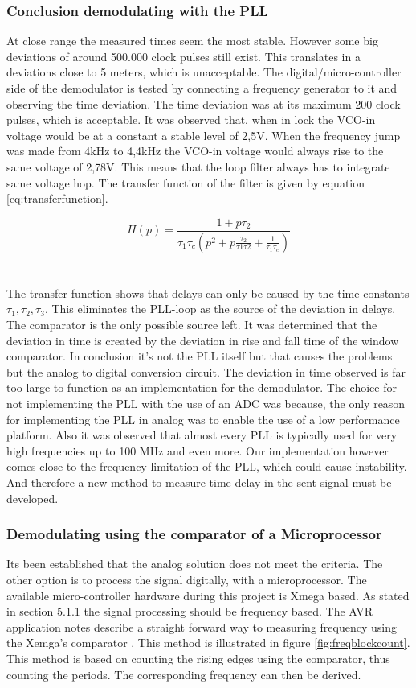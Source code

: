 \documentclass[10pt,a4paper]{article}
\begin{document}
\subsubsection{Conclusion demodulating with the PLL}
At close range the measured times seem the most stable. However some big deviations of around 500.000 clock pulses still exist. This translates in a deviations close to 5 meters, which is unacceptable. 
The digital/micro-controller side of the demodulator is tested by connecting a frequency generator to it and observing the time deviation. The time deviation was at its maximum 200 clock pulses, which is acceptable. It was observed that, when in lock the VCO-in voltage would be at a constant a stable level of 2,5V. When the frequency jump was made from 4kHz to 4,4kHz the VCO-in voltage would always rise to the same voltage of 2,78V. This means that the loop filter always has to integrate same voltage hop. The transfer function of the filter is given by equation \ref{eq:transferfunction}\cite{plldavid}.

\begin{equation}
H(p)=\frac{1+ p\tau_2}{\tau_1\tau_c(p^2+p\frac{\tau_2}{\tau1\tau2}+\frac{1}{\tau_1\tau_c})}
\label{eq:transferfunction}
\end{equation}
\\\\
The transfer function shows that delays can only be caused by the time constants $\tau_1,\tau_2,\tau_3$. This eliminates the PLL-loop as the source of the deviation in delays. The comparator is the only possible source left. It was determined that the deviation in time is created by the deviation in rise and fall time of the window comparator. In conclusion it's not the PLL itself but that causes the problems but the analog to digital conversion circuit. The deviation in time observed is far too large to function as an implementation for the demodulator. The choice for not implementing the PLL with the use of an ADC was because, the only reason for implementing the PLL in analog was to enable the use of a low performance platform. Also it was observed that almost every PLL is typically used for very high frequencies up to 100 MHz and even more. Our implementation however comes close to the frequency limitation of the PLL, which could cause instability. And therefore a new method to measure time delay in the sent signal must be developed.

\subsubsection{Demodulating using the comparator of a Microprocessor}
Its been established that the analog solution does not meet the criteria. The other option is to process the signal digitally, with a microprocessor. The available micro-controller hardware during this project is Xmega based. As stated in section 5.1.1 the signal processing should be frequency based. The AVR application notes describe a straight forward way to measuring frequency using the Xemga's comparator \cite{avrfrequency}. This method is illustrated in figure \ref{fig:freqblockcount}. This method is based on counting the rising edges using the comparator, thus counting the periods. The corresponding frequency can then be derived.  
\end{document}
